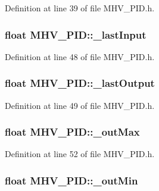 Definition at line 39 of file M\-H\-V\-\_\-\-P\-I\-D.\-h.

\hypertarget{class_m_h_v___p_i_d_aa649c3528fb35b99ac6ce0dca338fcfb}{
\subsubsection[{\-\_\-last\-Input}]{\setlength{\rightskip}{0pt plus 5cm}float M\-H\-V\-\_\-\-P\-I\-D\-::\-\_\-last\-Input\hspace{0.3cm}{\ttfamily [protected]}}}\label{class_m_h_v___p_i_d_aa649c3528fb35b99ac6ce0dca338fcfb}


Definition at line 48 of file M\-H\-V\-\_\-\-P\-I\-D.\-h.

\hypertarget{class_m_h_v___p_i_d_a8464b83c97658e1f78a0c927476af6de}{
\subsubsection[{\-\_\-last\-Output}]{\setlength{\rightskip}{0pt plus 5cm}float M\-H\-V\-\_\-\-P\-I\-D\-::\-\_\-last\-Output\hspace{0.3cm}{\ttfamily [protected]}}}\label{class_m_h_v___p_i_d_a8464b83c97658e1f78a0c927476af6de}


Definition at line 49 of file M\-H\-V\-\_\-\-P\-I\-D.\-h.

\hypertarget{class_m_h_v___p_i_d_a0ef2b6cdafc241e3678a4c4f3efbdcec}{
\subsubsection[{\-\_\-out\-Max}]{\setlength{\rightskip}{0pt plus 5cm}float M\-H\-V\-\_\-\-P\-I\-D\-::\-\_\-out\-Max\hspace{0.3cm}{\ttfamily [protected]}}}\label{class_m_h_v___p_i_d_a0ef2b6cdafc241e3678a4c4f3efbdcec}


Definition at line 52 of file M\-H\-V\-\_\-\-P\-I\-D.\-h.

\hypertarget{class_m_h_v___p_i_d_a1a7aba4cfb7c347428fade3e7a0f6e98}{
\subsubsection[{\-\_\-out\-Min}]{\setlength{\rightskip}{0pt plus 5cm}float M\-H\-V\-\_\-\-P\-I\-D\-::\-\_\-out\-Min\hspace{0.3cm}{\ttfamily [protected]}}}\label{class_m_h_v___p_i_d_a1a7aba4cfb7c347428fade3e7a0f6e98}


